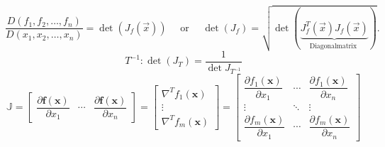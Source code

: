 \begin{equation}
\frac{D\left(f_{1}, f_{2}, \ldots, f_{n}\right)}{D\left(x_{1}, x_{2}, \ldots, x_{n}\right)}=\operatorname{det}\left(J_{f}(\vec{x})\right) \quad \text { or } \quad \operatorname{det}\left(J_{f}\right)=\sqrt{\operatorname{det}(\underbrace{J_{f}^{T}(\vec{x}) J_{f}(\vec{x})}_{\text {Diagonalmatrix }})} .
\end{equation}
\begin{equation}
    T^{-1}: \operatorname{det}\left(J_{T}\right)=\frac{1}{\operatorname{det} J_{T^{-1}}}
\end{equation}
$$
\mathbb{J}=\left[\begin{array}{ccc}
\dfrac{\partial \mathbf{f}(\mathbf{x})}{\partial x_{1}} & \cdots & \dfrac{\partial \mathbf{f}(\mathbf{x})}{\partial x_{n}}
\end{array}\right]=\left[\begin{array}{c}
\nabla^{T} f_{1}(\mathbf{x}) \\
\vdots \\
\nabla^{T} f_{m}(\mathbf{x})
\end{array}\right]=\left[\begin{array}{ccc}
\dfrac{\partial f_{1}(\mathbf{x})}{\partial x_{1}} & \cdots & \dfrac{\partial f_{1}(\mathbf{x})}{\partial x_{n}} \\
\vdots & \ddots & \vdots \\
\dfrac{\partial f_{m}(\mathbf{x})}{\partial x_{1}} & \cdots & \dfrac{\partial f_{m}(\mathbf{x})}{\partial x_{n}}
\end{array}\right]
$$
